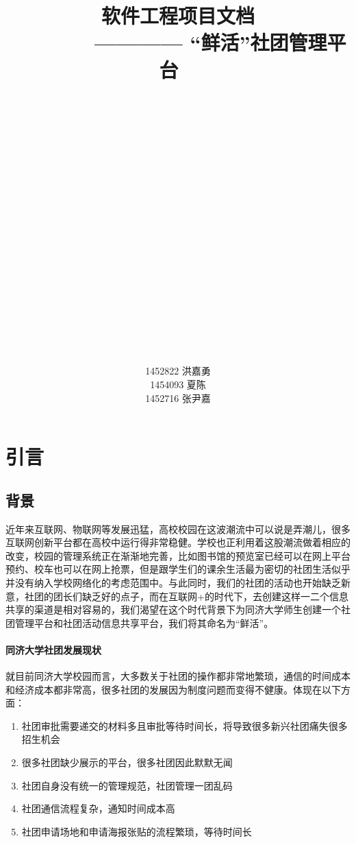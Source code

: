 \documentclass[UTF8]{ctexart}
\title{\Huge \textbf{软件工程项目文档}  \\
\large ~~~~~~~ ———— “鲜活”社团管理平台
 ~\\ ~\\ ~\\ ~\\ ~\\ ~\\ ~\\ ~\\ ~\\ ~\\ ~\\}
\author{
\large 1452822 洪嘉勇 \\
\large 1454093 夏陈   \\
\large 1452716 张尹嘉 \\
}
\begin{document}
\maketitle




\newpage
\tableofcontents
\newpage

\section{引言}
\subsection{背景}
近年来互联网、物联网等发展迅猛，高校校园在这波潮流中可以说是弄潮儿，很多互联网创新平台都在高校中运行得非常稳健。学校也正利用着这股潮流做着相应的改变，校园的管理系统正在渐渐地完善，比如图书馆的预览室已经可以在网上平台预约、校车也可以在网上抢票，但是跟学生们的课余生活最为密切的社团生活似乎并没有纳入学校网络化的考虑范围中。与此同时，我们的社团的活动也开始缺乏新意，社团的团长们缺乏好的点子，而在互联网+的时代下，去创建这样一二个信息共享的渠道是相对容易的，我们渴望在这个时代背景下为同济大学师生创建一个社团管理平台和社团活动信息共享平台，我们将其命名为“鲜活”。
\paragraph{同济大学社团发展现状} 
就目前同济大学校园而言，大多数关于社团的操作都非常地繁琐，通信的时间成本和经济成本都非常高，很多社团的发展因为制度问题而变得不健康。体现在以下方面：

\begin{enumerate}[1)]
\item 社团审批需要递交的材料多且审批等待时间长，将导致很多新兴社团痛失很多招生机会
\item 很多社团缺少展示的平台，很多社团因此默默无闻
\item 社团自身没有统一的管理规范，社团管理一团乱码
\item 社团通信流程复杂，通知时间成本高
\item 社团申请场地和申请海报张贴的流程繁琐，等待时间长
\end{enumerate}
\end{document}
